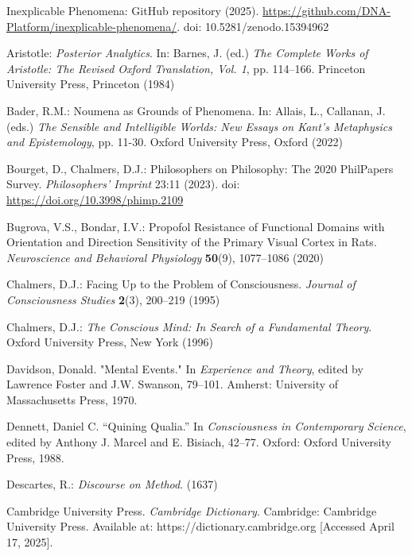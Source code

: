 \documentclass[runningheads]{llncs}
\begin{document}
\begin{thebibliography}{99}

 Inexplicable Phenomena: GitHub repository (2025). \href{https://github.com/DNA-Platform/inexplicable-phenomena/}{https://github.com/DNA-Platform/inexplicable-phenomena/}\xspace. doi: 10.5281/zenodo.15394962 \cite{Formalism}

 Aristotle: \emph{Posterior Analytics}. In: Barnes, J. (ed.) \emph{The Complete Works of Aristotle: The Revised Oxford Translation, Vol. 1}, pp. 114--166. Princeton University Press, Princeton (1984)

 Bader, R.M.: Noumena as Grounds of Phenomena. In: Allais, L., Callanan, J. (eds.) \emph{The Sensible and Intelligible Worlds: New Essays on Kant's Metaphysics and Epistemology}, pp. 11-30. Oxford University Press, Oxford (2022)

 Bourget, D., Chalmers, D.J.: Philosophers on Philosophy: The 2020 PhilPapers Survey. \emph{Philosophers' Imprint} 23:11 (2023). doi: \href{https://doi.org/10.3998/phimp.2109}{https://doi.org/10.3998/phimp.2109}\xspace

 Bugrova, V.S., Bondar, I.V.: Propofol Resistance of Functional Domains with Orientation and Direction Sensitivity of the Primary Visual Cortex in Rats. \emph{Neuroscience and Behavioral Physiology} \textbf{50}(9), 1077--1086 (2020)

 Chalmers, D.J.: Facing Up to the Problem of Consciousness. \emph{Journal of Consciousness Studies} \textbf{2}(3), 200--219 (1995)

 Chalmers, D.J.: \emph{The Conscious Mind: In Search of a Fundamental Theory}. Oxford University Press, New York (1996)

 Davidson, Donald. "Mental Events." In \emph{Experience and Theory}, edited by Lawrence Foster and J.W. Swanson, 79–101. Amherst: University of Massachusetts Press, 1970.

 Dennett, Daniel C. “Quining Qualia.” In \emph{Consciousness in Contemporary Science}, edited by Anthony J. Marcel and E. Bisiach, 42–77. Oxford: Oxford University Press, 1988.

 Descartes, R.: \emph{Discourse on Method}. (1637)

 Cambridge University Press. \emph{Cambridge Dictionary}. Cambridge: Cambridge University Press. Available at: https://dictionary.cambridge.org [Accessed April 17, 2025].


\end{thebibliography}
\end{document}
